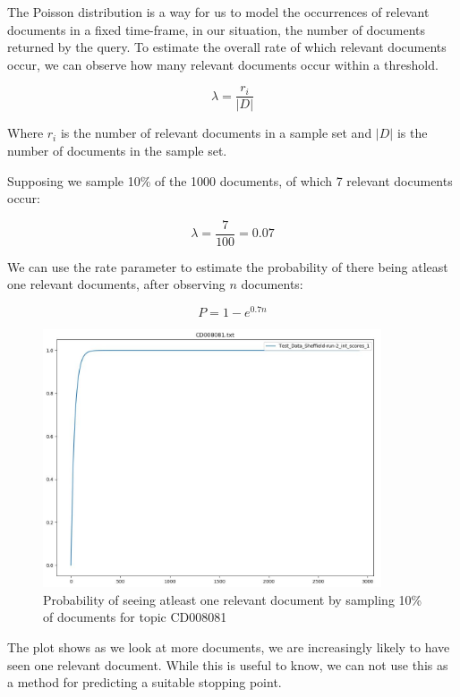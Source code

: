 The Poisson distribution is a way for us to model the occurrences of relevant documents in a fixed time-frame, in our situation, the number of documents returned by the query. To estimate the overall rate of which relevant documents occur, we can observe how many relevant documents occur within a threshold.


\begin{equation}
	  \lambda = \frac{r_i}{|D|}
\end{equation}

Where $r_i$ is the number of relevant documents in a sample set and $|D|$ is the number of documents in the sample set.

Supposing we sample 10\% of the 1000 documents, of which 7 relevant documents occur:

\begin{equation}
	  \lambda = \frac{7}{100} = 0.07
\end{equation}

We can use the rate parameter to estimate the probability of there being atleast one relevant documents, after observing $n$ documents:

\begin{equation}
	  P = 1 - e ^ {0.7n}
\end{equation}


\begin{figure}[H]
\center
\includegraphics[width=10cm]{figures/probOneDoc.jpg}
\caption{Probability of seeing atleast one relevant document by sampling 10\% of documents for topic CD008081}
\end{figure}

The plot shows as we look at more documents, we are increasingly likely to have seen one relevant document. While this is useful to know, we can not use this as a method for predicting a suitable stopping point.


